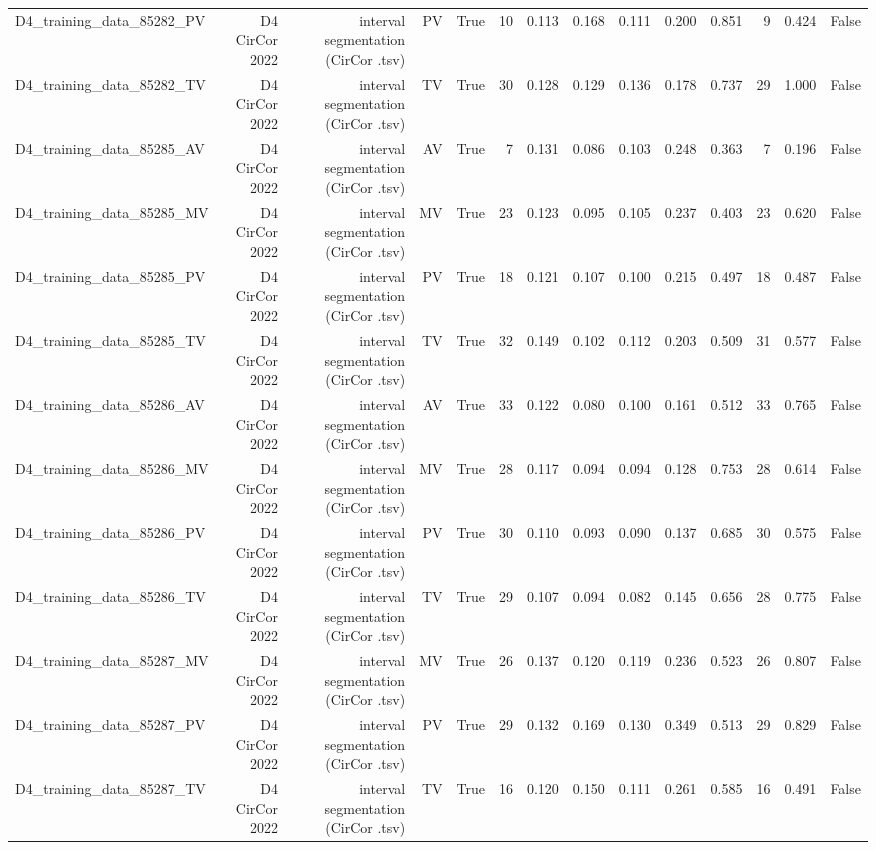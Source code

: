 \begin{table}[htbp]
\begin{tabular}{lrrrrrrrrrrrrr}
    D4\_training\_data\_85282\_PV & D4 CirCor 2022 & interval segmentation (CirCor .tsv) & PV & True & 10 & 0.113 & 0.168 & 0.111 & 0.200 & 0.851 & 9 & 0.424 & False \\
    D4\_training\_data\_85282\_TV & D4 CirCor 2022 & interval segmentation (CirCor .tsv) & TV & True & 30 & 0.128 & 0.129 & 0.136 & 0.178 & 0.737 & 29 & 1.000 & False \\
    D4\_training\_data\_85285\_AV & D4 CirCor 2022 & interval segmentation (CirCor .tsv) & AV & True & 7 & 0.131 & 0.086 & 0.103 & 0.248 & 0.363 & 7 & 0.196 & False \\
    D4\_training\_data\_85285\_MV & D4 CirCor 2022 & interval segmentation (CirCor .tsv) & MV & True & 23 & 0.123 & 0.095 & 0.105 & 0.237 & 0.403 & 23 & 0.620 & False \\
    D4\_training\_data\_85285\_PV & D4 CirCor 2022 & interval segmentation (CirCor .tsv) & PV & True & 18 & 0.121 & 0.107 & 0.100 & 0.215 & 0.497 & 18 & 0.487 & False \\
    D4\_training\_data\_85285\_TV & D4 CirCor 2022 & interval segmentation (CirCor .tsv) & TV & True & 32 & 0.149 & 0.102 & 0.112 & 0.203 & 0.509 & 31 & 0.577 & False \\
    D4\_training\_data\_85286\_AV & D4 CirCor 2022 & interval segmentation (CirCor .tsv) & AV & True & 33 & 0.122 & 0.080 & 0.100 & 0.161 & 0.512 & 33 & 0.765 & False \\
    D4\_training\_data\_85286\_MV & D4 CirCor 2022 & interval segmentation (CirCor .tsv) & MV & True & 28 & 0.117 & 0.094 & 0.094 & 0.128 & 0.753 & 28 & 0.614 & False \\
    D4\_training\_data\_85286\_PV & D4 CirCor 2022 & interval segmentation (CirCor .tsv) & PV & True & 30 & 0.110 & 0.093 & 0.090 & 0.137 & 0.685 & 30 & 0.575 & False \\
    D4\_training\_data\_85286\_TV & D4 CirCor 2022 & interval segmentation (CirCor .tsv) & TV & True & 29 & 0.107 & 0.094 & 0.082 & 0.145 & 0.656 & 28 & 0.775 & False \\
    D4\_training\_data\_85287\_MV & D4 CirCor 2022 & interval segmentation (CirCor .tsv) & MV & True & 26 & 0.137 & 0.120 & 0.119 & 0.236 & 0.523 & 26 & 0.807 & False \\
    D4\_training\_data\_85287\_PV & D4 CirCor 2022 & interval segmentation (CirCor .tsv) & PV & True & 29 & 0.132 & 0.169 & 0.130 & 0.349 & 0.513 & 29 & 0.829 & False \\
    D4\_training\_data\_85287\_TV & D4 CirCor 2022 & interval segmentation (CirCor .tsv) & TV & True & 16 & 0.120 & 0.150 & 0.111 & 0.261 & 0.585 & 16 & 0.491 & False \\

\end{tabular}
\end{table}
